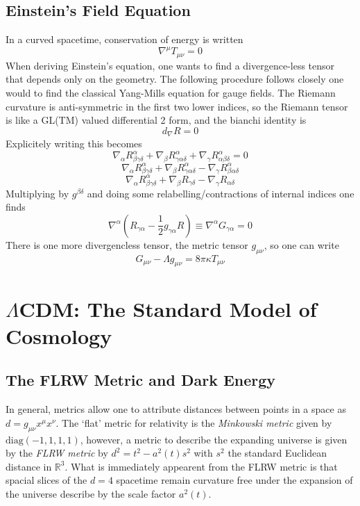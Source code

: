 \subsection{Einstein's Field Equation}
In a curved spacetime, conservation of energy is written
\begin{equation}
	\nabla^\mu T_{\mu\nu} = 0
\end{equation}
When deriving Einstein's equation, one wants to find a divergence-less tensor that depends only on the geometry. The following procedure follows closely one would to find the classical Yang-Mills equation for gauge fields. The Riemann curvature is anti-symmetric in the first two lower indices, so the Riemann tensor is like a GL(TM) valued differential 2 form, and the bianchi identity is
\begin{equation}
	d_{\nabla} R = 0
\end{equation}
Explicitely writing this becomes
\[ \nabla_{\alpha} R^{\alpha}_{\beta\gamma\delta} + \nabla_{\beta}R^{\alpha}_{\gamma\alpha\delta} + \nabla_{\gamma}R^{\alpha}_{\alpha\beta\delta} = 0 \]
\[ \nabla_{\alpha} R^{\alpha}_{\beta\gamma\delta} + \nabla_{\beta}R^{\alpha}_{\gamma\alpha\delta} - \nabla_{\gamma}R^{\alpha}_{\beta\alpha\delta} \]
\[ \nabla_{\alpha}R^{\alpha}_{\beta\gamma\delta} + \nabla_{\beta}R_{\gamma\delta} - \nabla_{\gamma}R_{\alpha\delta} \]
Multiplying by $g^{\beta\delta}$ and doing some relabelling/contractions of internal indices one finds
\begin{equation}
	\nabla^\alpha(R_{\gamma\alpha}-\frac{1}{2}g_{\gamma\alpha}R) \equiv \nabla^{\alpha}G_{\gamma\alpha} = 0
\end{equation}
There is one more divergencless tensor, the metric tensor $g_{\mu\nu}$, so one can write
\begin{equation}
	G_{\mu\nu} - \Lambda g_{\mu\nu} = 8\pi\kappa T_{\mu\nu}
\end{equation}

\section{$\Lambda$CDM: The Standard Model of Cosmology}


\subsection{The FLRW Metric and Dark Energy}
In general, metrics allow one to attribute distances between points in a space as $d = g_{\mu\nu}x^\mu x^\nu$. 
The `flat' metric for relativity is the \textit{Minkowski metric} given by $\text{diag}(-1,1,1,1)$, however, a metric to describe the expanding universe is given by the \textit{FLRW metric} by $d^2 = t^2-a^2(t)s^2$ with $s^2$ the standard Euclidean distance in $\mathbb{R}^3$. 
What is immediately appearent from the FLRW metric is that spacial slices of the $d=4$ spacetime remain curvature free under the expansion of the universe describe by the scale factor $a^2(t)$.

